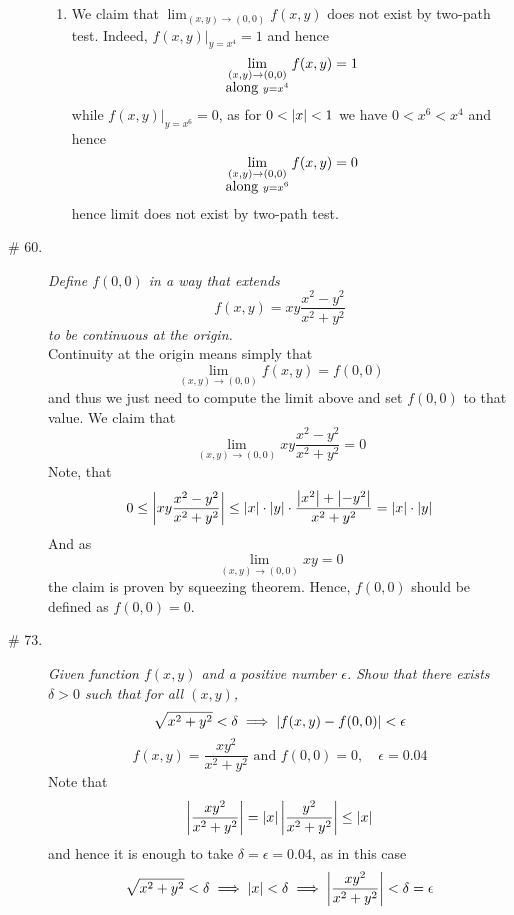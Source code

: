 \documentclass[8pt]{article} %
\begin{document}
\begin{description}
{\begin{enumerate}[\bfseries a.]
				hence \[x^4>\frac{81}{16}>\frac{7}{2}>y>0\]
				and thus $\myabs{f(x,y)-0}=\myabs{0-0}=0<\epsilon$.
			\item We claim that $\lim_{(x,y)\to(0,0)}f(x,y)$ does not exist by two-path test. Indeed, 
				$f(x,y)\bigg|_{y=x^4}=1$ and hence 
				\[\lim_{\begin{subarray}{c}(x,y)\to(0,0)\\\mbox{along }y=x^4\end{subarray}}f(x,y)=1\]
					while $f(x,y)\bigg|_{y=x^6}=0$, as for $0<\left|x\right|<1$ we have $0<x^6<x^4$ and hence
				\[\lim_{\begin{subarray}{c}(x,y)\to(0,0)\\\mbox{along }y=x^6\end{subarray}}f(x,y)=0\]
				hence limit does not exist by two-path test.
		\end{enumerate}
		}
	\item[\# 60.]{{\it Define $f(0,0)$ in a way that extends \[f(x,y)=xy\frac{x^2-y^2}{x^2+y^2}\] to be continuous at the origin.}
		\\Continuity at the origin means simply that \[\lim_{(x,y)\to(0,0)}f(x,y)=f(0,0)\] and thus we just need to compute
		the limit above and set $f(0,0)$ to that value. We claim that \[\lim_{(x,y)\to(0,0)}xy\frac{x^2-y^2}{x^2+y^2}=0\]
		Note, that
		\[0\leq
		\left|xy\frac{x^2-y^2}{x^2+y^2}\right|\leq\left|x\right|\cdot\left|y\right|\cdot\frac{\left|x^2\right|+\left|-y^2\right|}{x^2+y^2}=\left|x\right|
		\cdot\left|y\right|\]
		And as \[\lim_{(x,y)\to(0,0)}xy=0\]
		the claim is proven by squeezing theorem. Hence, $f(0,0)$ should be defined as $f(0,0)=0$.
	}
	\item[\# 73.]{{\it Given function $f(x,y)$ and a positive number $\epsilon$. Show that there exists $\delta>0$ such that
		for all $(x,y)$,\[\sqrt{x^2+y^2}<\delta\implies\left|f(x,y)-f(0,0)\right|<\epsilon\]}
		\[f(x,y)=\frac{xy^2}{x^2+y^2}\mbox{ and }f(0,0)=0,\quad\epsilon=0.04\]
		Note that
		\[\left|\frac{xy^2}{x^2+y^2}\right|=\left|x\right|\left|\frac{y^2}{x^2+y^2}\right|\leq\left|x\right|\]
		and hence it is enough to take $\delta=\epsilon=0.04$, as in this case
		\[\sqrt{x^2+y^2}<\delta\implies\left|x\right|<\delta\implies\left|\frac{xy^2}{x^2+y^2}\right|<\delta=\epsilon\]
		}

\end{description}
\end{document}
